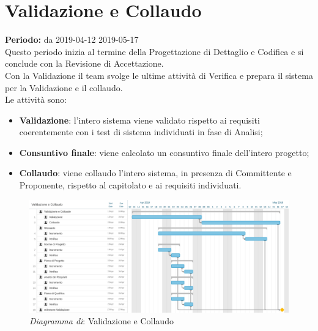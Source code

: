 \section{Validazione e Collaudo}
\textbf{Periodo:} da 2019-04-12 2019-05-17\\
Questo periodo inizia al termine della Progettazione di Dettaglio e Codifica e si conclude con la Revisione di Accettazione.\\Con la Validazione il team svolge le ultime attività di Verifica e prepara il sistema per la Validazione e il collaudo.\\
Le attività sono:
\begin{itemize}
   \item \textbf{Validazione}: l'intero sistema viene validato rispetto ai requisiti coerentemente con i test di sistema individuati in fase di Analisi;
   \item \textbf{Consuntivo finale}: viene calcolato un consuntivo finale dell'intero progetto;
   \item \textbf{Collaudo}: viene collaudo l'intero sistema, in presenza di Committente e Proponente, rispetto al capitolato e ai requisiti individuati. 
\end{itemize}
\begin{figure} [h]
    \centering
    \includegraphics[scale=0.14]{./images/validazione_collaudo.jpg}
    \caption{\textit{Diagramma di}: Validazione e Collaudo }\label{}
\end{figure}